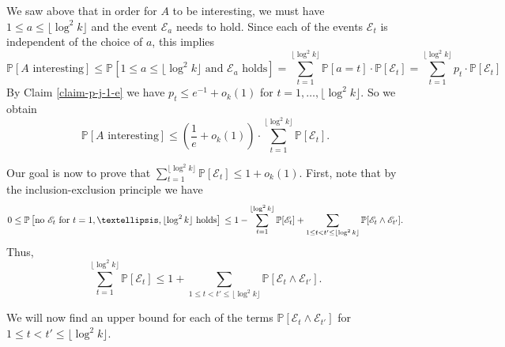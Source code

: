 \documentclass[11pt]{article}
\theoremstyle{definition}
\numberwithin{equation}{section}
\begin{document}
We saw above that in order for $A$ to be interesting, we must have $1\leq a\leq \lfloor\log^2 k\rfloor$ and the event $\mathscr{E}_a$ needs to hold. Since each of the events $\mathscr{E}_t$ is independent of the choice of $a$, this implies
\[\mathbb{P}\left[A\text{ interesting}\right]\leq \mathbb{P}\left[1\leq a\leq \lfloor\log^2 k\rfloor\text{ and }\mathscr{E}_a\text{ holds}\right]=\sum_{t=1}^{\lfloor\log^2 k\rfloor} \mathbb{P}[a=t]\cdot \mathbb{P}[\mathscr{E}_t]=\sum_{t=1}^{\lfloor\log^2 k\rfloor} p_t\cdot \mathbb{P}[\mathscr{E}_t]\]
By Claim \ref{claim-p-j-1-e} we have $p_t\leq e^{-1}+o_k(1)$ for $t=1, \dots, \lfloor\log^2 k\rfloor$. So we obtain
\begin{equation}\label{ineq-A-interesting-E-t}
\mathbb{P}\left[A\text{ interesting}\right]\leq \left(\frac{1}{e}+o_k(1)\right)\cdot \sum_{t=1}^{\lfloor\log^2 k\rfloor} \mathbb{P}[\mathscr{E}_t].
\end{equation}

Our goal is now to prove that $\sum_{t=1}^{\lfloor\log^2 k\rfloor} \mathbb{P}[\mathscr{E}_t]\leq 1+o_k(1)$. First, note that by the inclusion-exclusion principle we have
\[0\leq \mathbb{P}\left[\text{no }\mathscr{E}_t\text{ for }t=1, \dots, \lfloor\log^2 k\rfloor\text{ holds}\right]\\
\leq 1-\sum_{t=1}^{\lfloor\log^2 k\rfloor} \mathbb{P}[\mathscr{E}_t]+\sum_{1\leq t<t'\leq \lfloor\log^2 k\rfloor}\mathbb{P}[\mathscr{E}_t\wedge\mathscr{E}_{t'}].\]
Thus,
\begin{equation}\label{ineq-sum-e-t}
\sum_{t=1}^{\lfloor\log^2 k\rfloor} \mathbb{P}[\mathscr{E}_t]\leq 1+\sum_{1\leq t<t'\leq \lfloor\log^2 k\rfloor}\mathbb{P}[\mathscr{E}_t\wedge\mathscr{E}_{t'}].
\end{equation}

We will now find an upper bound for each of the terms $\mathbb{P}[\mathscr{E}_t\wedge\mathscr{E}_{t'}]$ for $1\leq t<t'\leq \lfloor\log^2 k\rfloor$.
\end{document}
